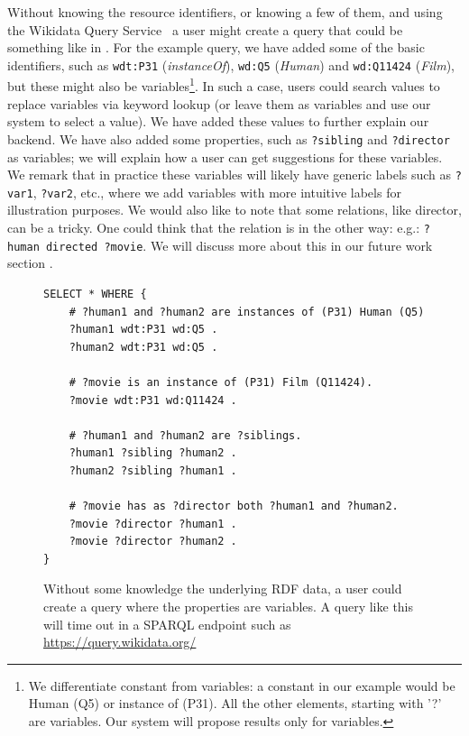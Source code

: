 Without knowing the resource identifiers, or knowing a few of them, and using the Wikidata Query Service~\cite{wikidataQueryService} a user might create a query that could be something like in . 
For the example query, we have added some of the basic identifiers, such as \texttt{wdt:P31} (\textit{instanceOf}), \texttt{wd:Q5} (\textit{Human}) and \texttt{wd:Q11424} (\textit{Film}), but these might also be variables\footnote{We differentiate constant from variables: a constant in our example would be Human (Q5) or instance of (P31). All the other elements, starting with '?' are variables. Our system will propose results only for variables.}. 
In such a case, users could search values to replace variables via keyword lookup (or leave them as variables and use our system to select a value). 
We have added these values to further explain our backend. We have also added some properties, such as \texttt{?sibling} and \texttt{?director} as variables; we will explain how a user can get suggestions for these variables.
We remark that in practice these variables will likely have generic labels such as \texttt{?var1}, \texttt{?var2}, etc., where we add variables with more intuitive labels for illustration purposes. 
We would also like to note that some relations, like director, can be a tricky. One could think that the relation is in the other way: e.g.: \texttt{?human directed ?movie}. We will discuss more about this in our future work section .

\begin{figure}[H]
\begin{verbatim}
SELECT * WHERE {
    # ?human1 and ?human2 are instances of (P31) Human (Q5)
    ?human1 wdt:P31 wd:Q5 .
    ?human2 wdt:P31 wd:Q5 .
    
    # ?movie is an instance of (P31) Film (Q11424).
    ?movie wdt:P31 wd:Q11424 .
    
    # ?human1 and ?human2 are ?siblings.
    ?human1 ?sibling ?human2 .
    ?human2 ?sibling ?human1 .
    
    # ?movie has as ?director both ?human1 and ?human2.
    ?movie ?director ?human1 .
    ?movie ?director ?human2 .
}
\end{verbatim}
\caption{Without some knowledge the underlying RDF data, a user could create a query where the properties are variables. A query like this will time out in a SPARQL endpoint such as \url{https://query.wikidata.org/}}
\label{fig:siblingsSPARQL}
\end{figure}

